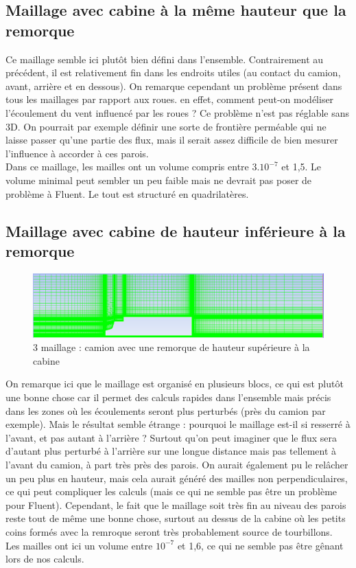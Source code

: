 \subsection{Maillage avec cabine à la même hauteur que la remorque}
Ce maillage semble ici plutôt bien défini dans l'ensemble. Contrairement au précédent, il est relativement fin dans les endroits utiles (au contact du camion, avant, arrière et en dessous). On remarque cependant un problème présent dans tous les maillages par rapport aux roues. en effet, comment peut-on modéliser l'écoulement du vent influencé par les roues ? Ce problème n'est pas réglable sans 3D. On pourrait par exemple définir une sorte de frontière perméable qui ne laisse passer qu'une partie des flux, mais il serait assez difficile de bien mesurer l'influence à accorder à ces parois.\\
Dans ce maillage, les mailles ont un volume compris entre $3.10^{-7}$ et 1,5. Le volume minimal peut sembler un peu faible mais ne devrait pas poser de problème à Fluent. Le tout est structuré en quadrilatères.

\subsection{Maillage avec cabine de hauteur inférieure à la remorque}
\begin{figure}[!h]
\centering
\includegraphics[scale=0.38]{images/camion_remorque_1.png}
\caption{3\ieme{} maillage : camion avec une remorque de hauteur supérieure à la cabine}
\end{figure}
On remarque ici que le maillage est organisé en plusieurs blocs, ce qui est plutôt une bonne chose car il permet des calculs rapides dans l'ensemble mais précis dans les zones où les écoulements seront plus perturbés (près du camion par exemple). Mais le résultat semble étrange : pourquoi le maillage est-il si resserré à l'avant, et pas autant à l'arrière ? Surtout qu'on peut imaginer que le flux sera d'autant plus perturbé à l'arrière sur une longue distance mais pas tellement à l'avant du camion, à part très près des parois. On aurait également pu le relâcher un peu plus en hauteur, mais cela aurait généré des mailles non perpendiculaires, ce qui peut compliquer les calculs (mais ce qui ne semble pas être un problème pour Fluent). Cependant, le fait que le maillage soit très fin au niveau des parois reste tout de même une bonne chose, surtout au dessus de la cabine où les petits coins formés avec la remroque seront très probablement source de tourbillons. \\
Les mailles ont ici un volume entre $10^{-7}$ et 1,6, ce qui ne semble pas être gênant lors de nos calculs.

